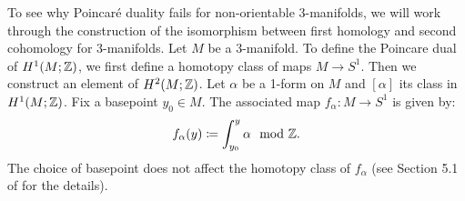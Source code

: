 To see why Poincar\'e duality fails for non-orientable 3-manifolds, we will work through the construction of the isomorphism between first homology and second cohomology for 3-manifolds.  Let $M$ be a 3-manifold.
To define the Poincare dual of $H^1(M;\mathbb{Z})$, we first define a homotopy class of maps $M\rightarrow S^1$.  Then we construct an element of $H^2(M;\mathbb{Z})$.
Let $\alpha$ be a 1-form on $M$ and $[\alpha]$ its class in $H^1(M; \mathbb{Z})$.  Fix a basepoint $y_0\in M$.
The associated map $f_{\alpha}:M\rightarrow S^1$ is given by:
\begin{align}\label{form:map}
  f_{\alpha}(y) \coloneqq  \int_{y_0}^y \alpha \mod {\mathbb{Z}}.
\end{align}
The choice of basepoint does not affect the homotopy class of $f_\alpha$
(see Section 5.1 of \cite{calegari2007foliations} for the details).

